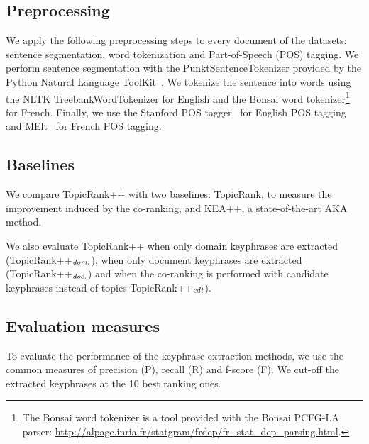   \subsection{Preprocessing}
  \label{subsec:preprocessing}
    We apply the following preprocessing steps to every document of the
    datasets: sentence segmentation, word tokenization and Part-of-Speech (POS)
    tagging. We perform sentence segmentation with the PunktSentenceTokenizer
    provided by the Python Natural Language ToolKit~\cite[NLTK]{bird2009nltk}.
    We tokenize the sentence into words using the NLTK TreebankWordTokenizer for
    English and the Bonsai word tokenizer\footnote{The Bonsai word tokenizer is
    a tool provided with the Bonsai PCFG-LA parser:
    \url{http://alpage.inria.fr/statgram/frdep/fr_stat_dep_parsing.html}.} for
    French. Finally, we use the Stanford POS
    tagger~\cite{toutanova2003stanfordpostagger} for English POS tagging and
    MElt~\cite{denis2009melt} for French POS tagging.

  \subsection{Baselines}
  \label{subsec:baselines}
    We compare TopicRank++ with two baselines: TopicRank, to measure the
    improvement induced by the co-ranking, and KEA++, a state-of-the-art AKA
    method.

    We also evaluate TopicRank++ when only domain keyphrases are extracted
    (TopicRank++$_\textnormal{\emph{dom.}}$), when only document keyphrases are
    extracted (TopicRank++$_\textnormal{\emph{doc.}}$) and when the co-ranking
    is performed with candidate keyphrases instead of topics
    TopicRank++$_\textnormal{\emph{cdt}}$).

  \subsection{Evaluation measures}
  \label{subsec:evaluation_measures}
    To evaluate the performance of the keyphrase extraction methods, we use the
    common measures of precision (P), recall (R) and f-score (F). We cut-off the
    extracted keyphrases at the 10 best ranking ones.

